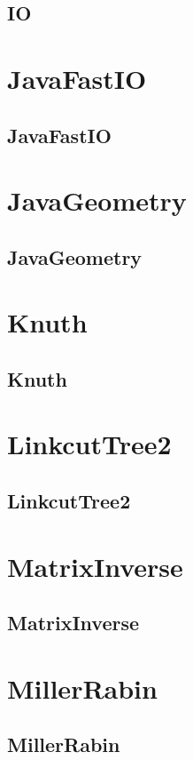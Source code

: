 \documentclass[a4paper, twocolumn]{article}
\begin{document}
\subsection{IO}

\section{JavaFastIO}
\subsection{JavaFastIO}

\section{JavaGeometry}
\subsection{JavaGeometry}

\section{Knuth}
\subsection{Knuth}

\section{LinkcutTree2}
\subsection{LinkcutTree2}

\section{MatrixInverse}
\subsection{MatrixInverse}

\section{MillerRabin}
\subsection{MillerRabin}

\end{document}
